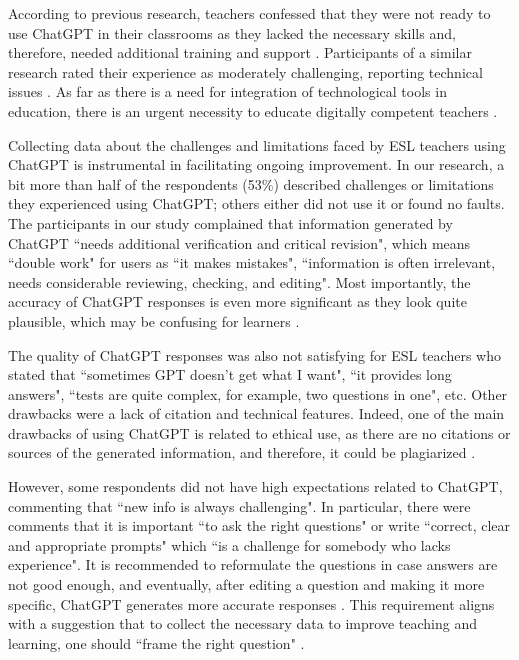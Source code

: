 \documentclass[english]{textolivre}
\begin{document}
According to previous research, teachers confessed that they were not ready to use ChatGPT in their classrooms as they lacked the necessary skills and, therefore, needed additional training and support \cite[p. 104]{iqbal2023}. Participants of a similar research rated their experience as moderately challenging, reporting technical issues \cite[p. 16]{nguyen2023}. As far as there is a need for integration of technological tools in education, there is an urgent necessity to educate digitally competent teachers \cite{instefjord2017}.

Collecting data about the challenges and limitations faced by ESL teachers using ChatGPT is instrumental in facilitating ongoing improvement. In our research, a bit more than half of the respondents (53\%) described challenges or limitations they experienced using ChatGPT; others either did not use it or found no faults. The participants in our study complained that information generated by ChatGPT ``needs additional verification and critical revision", which means ``double work" for users as ``it makes mistakes", ``information is often irrelevant, needs considerable reviewing, checking, and editing". Most importantly, the accuracy of ChatGPT responses is even more significant as they look quite plausible, which may be confusing for learners \cite[p. 545]{kohnke2023}.

The quality of ChatGPT responses was also not satisfying for ESL teachers who stated that ``sometimes GPT doesn’t get what I want", ``it provides long answers", ``tests are quite complex, for example, two questions in one", etc. Other drawbacks were a lack of citation and technical features. Indeed, one of the main drawbacks of using ChatGPT is related to ethical use, as there are no citations or sources of the generated information, and therefore, it could be plagiarized \cite[p. 544]{kohnke2023}.

However, some respondents did not have high expectations related to ChatGPT, commenting that ``new info is always challenging". In particular, there were comments that it is important ``to ask the right questions" or write ``correct, clear and appropriate prompts" which ``is a challenge for somebody who lacks experience". It is recommended to reformulate the questions in case answers are not good enough, and eventually, after editing a question and making it more specific, ChatGPT generates more accurate responses \cites[p. 544]{kohnke2023}[p. 20]{nguyen2023}. This requirement aligns with a suggestion that to collect the necessary data to improve teaching and learning, one should ``frame the right question" \cite[p. 1]{patel2021}.
\end{document}
